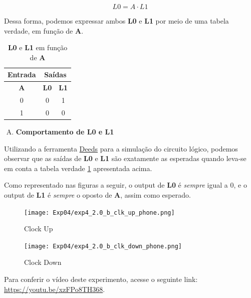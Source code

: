 \documentclass[12pt]{article}
\begin{document}
\begin{equation}
L0 = A \cdot L1\label{eq:L0}
\end{equation}

Dessa forma, podemos expressar ambos \textbf{L0} e \textbf{L1} por meio de uma
tabela verdade, em função de \textbf{A}.

\begin{table}[H]
    \centering
    \caption{\textbf{L0} e \textbf{L1} em função de \textbf{A}}
    \begin{tabular}{|c|c|c|}\hline
        \multicolumn{1}{|c|}{Entrada} & \multicolumn{2}{|c|}{Saídas} \\\hline
        \textbf{A} & \textbf{L0} & \textbf{L1} \\\hline
        0 & 0 & 1 \\\hline
        1 & 0 & 0 \\\hline
    \end{tabular}\label{tab:atraso_de_propagação:L0_L1}
\end{table}

\begin{enumerate}[B)]
\item \textbf{Comportamento de L0 e L1}
\end{enumerate}

Utilizando a ferramenta
\href{https://www.digitalelectronicsdeeds.com/deeds.html}{Deeds} para a
simulação do circuito lógico, podemos observar que as saídas de \textbf{L0} e
\textbf{L1} são exatamente as esperadas quando leva-se em conta a tabela verdade
\ref{tab:atraso_de_propagação:L0_L1} apresentada acima.

Como representado nas figuras a seguir, o output de \textbf{L0} é \emph{sempre}
igual a $0$, e o output de \textbf{L1} é \emph{sempre} o oposto de \textbf{A},
assim como esperado.

\begin{figure}[H]
    \centering
    \texttt{[image: Exp04/exp4\_2.0\_b\_clk\_up\_phone.png]}
    \caption{Clock Up}\label{fig:exp4_2.0_b_clk_up_phone.png}
\end{figure}

\begin{figure}[H]
    \centering
    \texttt{[image: Exp04/exp4\_2.0\_b\_clk\_down\_phone.png]}
    \caption{Clock Down}\label{fig:exp4_2.0_b_clk_down_phone.png}
\end{figure}

Para conferir o vídeo deste experimento, acesse o seguinte link:
\href{https://youtu.be/xzFPo8TH368}{https://youtu.be/xzFPo8TH368}.
\end{document}
